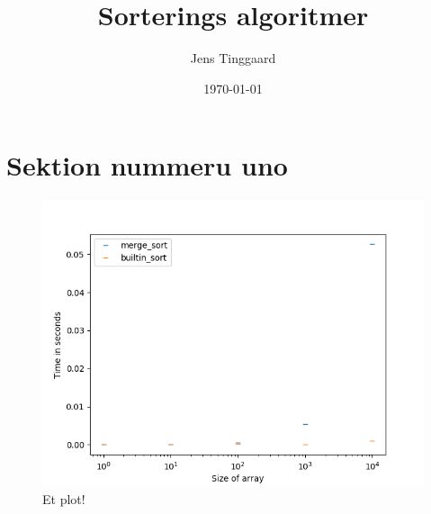 \documentclass[12pt]{article}
\date{\today}
\title{Sorterings algoritmer}
\author{Jens Tinggaard}
\begin{document}
    \maketitle


    \section{Sektion nummeru uno}





    \begin{figure}
        \includegraphics[scale=0.5, center]{figur1.png}
        \caption{Et plot!}
        \label{Figur 1}
    \end{figure}


\end{document}
